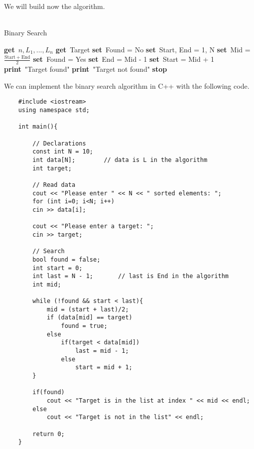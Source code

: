 \documentclass[]{article}
\newcommand{\Get}{\State \textbf{get}~}
\newcommand{\Set}{\State \textbf{set}~}
\newcommand{\Print}{\State \textbf{print}~}
\newcommand{\Stop}{\State \textbf{stop}~}
\begin{document}
We will build now the algorithm.

\begin{algorithm}
	\caption{\\Binary Search}
	\begin{algorithmic}[1]
		\Get $n, L_1, ..., L_n$
		\Get Target
		\Set Found = No
		\Set Start, End = 1, N
		\Set Mid = $\frac{\mathrm{Start + End}}{2}$
		\Set Found = Yes
		\Else
		\Set End = Mid - 1
		\Else
		\Set Start = Mid + 1
		\EndIf
		\EndIf
		\EndWhile
		\Print "Target found"
		\Else
		\Print "Target not found"
		\EndIf
		\Stop
	\end{algorithmic}
\end{algorithm}

We can implement the binary search algorithm in C++ with the following code.

\begin{lstlisting}
	#include <iostream>
	using namespace std;
	
	int main(){
		
		// Declarations
		const int N = 10;
		int data[N];		// data is L in the algorithm
		int target;
		
		// Read data
		cout << "Please enter " << N << " sorted elements: ";
		for (int i=0; i<N; i++)
		cin >> data[i];
		
		cout << "Please enter a target: ";
		cin >> target;
		
		// Search
		bool found = false;
		int start = 0;
		int last = N - 1;       // last is End in the algorithm
		int mid;
		
		while (!found && start < last){
			mid = (start + last)/2;
			if (data[mid] == target)
				found = true;
			else
				if(target < data[mid])
					last = mid - 1;
				else
					start = mid + 1;
		}
		
		if(found)
			cout << "Target is in the list at index " << mid << endl;
		else
			cout << "Target is not in the list" << endl;
		
		return 0;
	}

\end{lstlisting}\bigbreak
\end{document}
